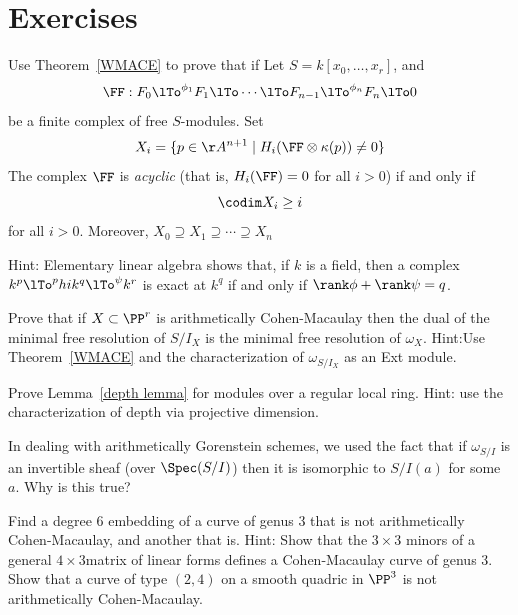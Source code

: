 \section{Exercises}

\begin{exercise}\label{WMACE corollary}
Use Theorem~\ref{WMACE} to prove that if
 Let $S = k[x_0,\dots, x_r]$, and
 $$ 
\FF:  F_0\lTo^{\phi_1}F_1 \lTo \cdots \lTo F_{n-1}\lTo^{\phi_n} F_n\lTo 0
 $$
be a finite complex of free $S$-modules. Set
$$
X_i = \{p\in \AA^{n+1} \mid  H_i(\FF \otimes \kappa(p)) \neq 0\}
$$
The complex $\FF$ is \emph{acyclic} (that is, $H_i(\FF) = 0$ for all $i>0$) if and only if
$$
\codim X_i \geq i
$$
for all $i>0$. Moreover, $X_{0}\supseteq X_{1}\supseteq \cdots \supseteq X_{n}$

Hint: Elementary linear algebra shows that, if $k$ is a field, then a complex $k^p \lTo^phi k^q \lTo^\psi k^r$ is exact at $k^q$ if and
only if $\rank \phi +\rank \psi = q$. 
\end{exercise}

\begin{exercise}
Prove that if $X\subset \PP^r$ is arithmetically Cohen-Macaulay then the dual of the minimal free resolution of $S/I_X$
is the minimal free resolution of $\omega_X$. Hint:Use Theorem~\ref{WMACE} and the characterization of $\omega_{S/I_X}$
as an Ext module.
\end{exercise}

\begin{exercise}
 Prove Lemma~\ref{depth lemma} for modules over a regular local ring.  Hint: use the characterization of depth
 via projective dimension.
\end{exercise}

\begin{exercise}
In dealing with arithmetically Gorenstein schemes, we used the fact that if $\omega_{S/I}$ is an invertible
sheaf (over $\Spec(S/I)$) then it is isomorphic to $S/I(a)$ for some $a$. Why is this true?
\end{exercise}

\begin{exercise}
Find a degree 6 embedding of a curve of genus 3 that is not arithmetically Cohen-Macaulay, and another that is.
Hint: Show that the $3\times 3$ minors of a general $4\times 3$matrix of linear forms defines a Cohen-Macaulay curve
of genus 3. Show that a curve of type $(2,4)$ on a smooth quadric in $\PP^3$ is not arithmetically Cohen-Macaulay.
\end{exercise}

